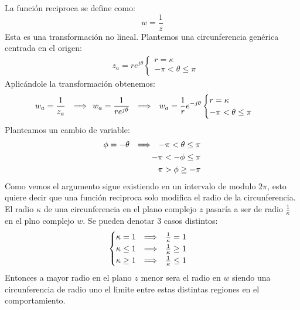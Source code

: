 
La función reciproca se define como:
\begin{equation}
    w=\frac{1}{z}
\end{equation}
Esta es una transformación no lineal.
Plantemos una circunferencia genérica centrada en el origen:
\begin{equation}
\begin{aligned}
    &z_a=re^{j\theta}\begin{cases}
        r=\kappa\\
        -\pi<\theta\leq\pi
    \end{cases}
\end{aligned}
\end{equation}
Aplicándole la transformación obtenemos:
\begin{equation}
\begin{aligned}
     w_a=\frac{1}{z_a}\hspace{0.25cm} \Longrightarrow \hspace{0.25cm} &w_a=\frac{1}{re^{j\theta}}\hspace{0.25cm} \Longrightarrow \hspace{0.25cm} w_a=\frac{1}{r}e^{-j\theta}\begin{cases}
        r=\kappa\\
        -\pi<\theta\leq\pi
        \end{cases}
\end{aligned}
\end{equation}
Planteamos un cambio de variable:
\begin{equation}
\begin{aligned}
    \phi=-\theta \hspace{0.25cm} \Longrightarrow \hspace{0.25cm} -\pi<\theta\leq\pi&\\
                        -\pi<-\phi\leq\pi&\\
                        \pi>\phi\geq-\pi&
\end{aligned}
\end{equation}
Como vemos el argumento sigue existiendo en un intervalo de modulo $2\pi$, esto quiere decir que una función reciproca solo modifica el radio de la circunferencia. El radio $\kappa$ de una circunferencia en el plano complejo $z$ pasaría a ser de radio $\frac{1}{\kappa}$ en el plno complejo $w$. Se pueden denotar 3 casos distintos:
\begin{equation}
    \begin{cases}
        \kappa=1 \hspace{0.25cm} \Longrightarrow \hspace{0.25cm} \frac{1}{\kappa}=1\\
        \kappa\leq 1 \hspace{0.25cm} \Longrightarrow \hspace{0.25cm} \frac{1}{\kappa}\geq1\\
        \kappa\geq 1 \hspace{0.25cm} \Longrightarrow \hspace{0.25cm} \frac{1}{\kappa}\leq1
    \end{cases}
\end{equation}
Entonces a mayor radio en el plano $z$ menor sera el radio en $w$ siendo una circunferencia de radio uno el limite entre estas distintas regiones en el comportamiento.
